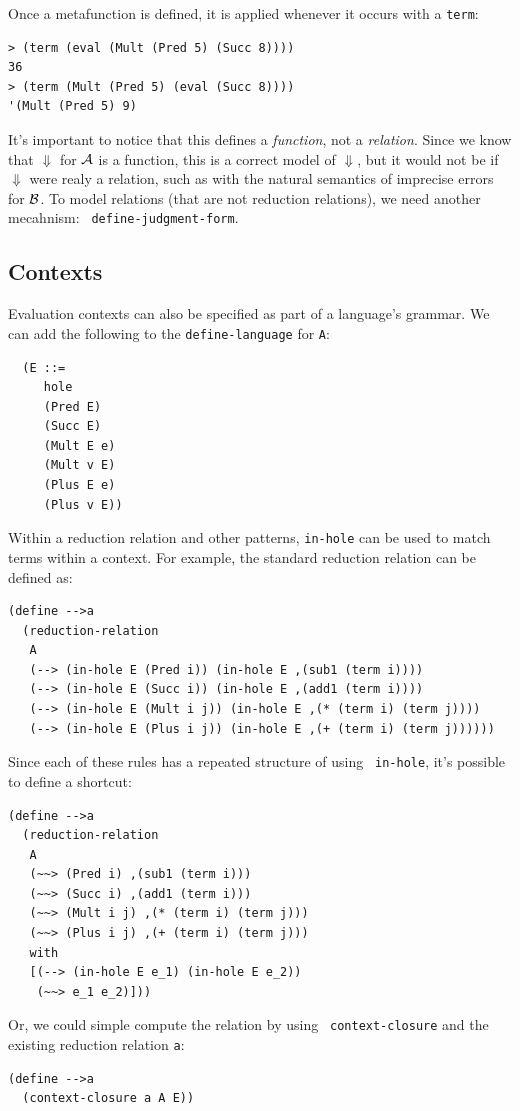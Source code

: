 Once a metafunction is defined, it is applied whenever it occurs with
a {\tt term}:
\begin{verbatim}
> (term (eval (Mult (Pred 5) (Succ 8))))
36
> (term (Mult (Pred 5) (eval (Succ 8))))
'(Mult (Pred 5) 9)
\end{verbatim}

It's important to notice that this defines a \emph{function}, not a
\emph{relation}.  Since we know that $\Downarrow$ for $\mathcal{A}$ is a
function, this is a correct model of $\Downarrow$, but it would not be
if $\Downarrow$ were realy a relation, such as with the natural
semantics of imprecise errors for $\mathcal{B}$.  To model relations (that
are not reduction relations), we need another mecahnism: {\tt
  define-judgment-form}.

\subsection{Contexts}

Evaluation contexts can also be specified as part of a language's
grammar.  We can add the following to the {\tt define-language} for
{\tt A}:
\begin{verbatim}
  (E ::=
     hole
     (Pred E)
     (Succ E)
     (Mult E e)
     (Mult v E)
     (Plus E e)
     (Plus v E))
\end{verbatim}

Within a reduction relation and other patterns, {\tt in-hole} can be
used to match terms within a context.  For example, the standard
reduction relation can be defined as:
\begin{verbatim}
(define -->a
  (reduction-relation
   A
   (--> (in-hole E (Pred i)) (in-hole E ,(sub1 (term i))))
   (--> (in-hole E (Succ i)) (in-hole E ,(add1 (term i))))
   (--> (in-hole E (Mult i j)) (in-hole E ,(* (term i) (term j))))
   (--> (in-hole E (Plus i j)) (in-hole E ,(+ (term i) (term j))))))
\end{verbatim}

Since each of these rules has a repeated structure of using {\tt
  in-hole}, it's possible to define a shortcut:
\begin{verbatim}
(define -->a
  (reduction-relation
   A
   (~~> (Pred i) ,(sub1 (term i)))                                                              
   (~~> (Succ i) ,(add1 (term i)))                                                                   
   (~~> (Mult i j) ,(* (term i) (term j)))
   (~~> (Plus i j) ,(+ (term i) (term j)))
   with
   [(--> (in-hole E e_1) (in-hole E e_2))
    (~~> e_1 e_2)]))
\end{verbatim}
Or, we could simple compute the relation by using {\tt
  context-closure} and the existing reduction relation {\tt a}:
\begin{verbatim}
(define -->a
  (context-closure a A E))
\end{verbatim}

